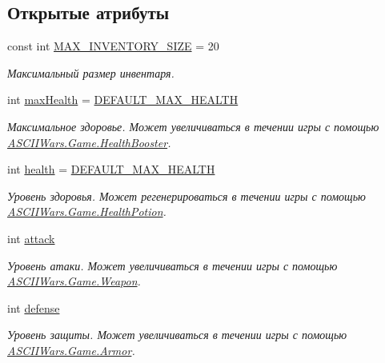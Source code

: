 \subsection*{Открытые атрибуты}
\begin{DoxyCompactItemize}
\item 
const int \hyperlink{class_a_s_c_i_i_wars_1_1_game_1_1_player_a1cc8a05398a717bcf8c5a0ebd2ea0747}{M\+A\+X\+\_\+\+I\+N\+V\+E\+N\+T\+O\+R\+Y\+\_\+\+S\+I\+ZE} = 20
\begin{DoxyCompactList}\small\item\em Максимальный размер инвентаря. \end{DoxyCompactList}\item 
int \hyperlink{class_a_s_c_i_i_wars_1_1_game_1_1_player_acfd121f865f0e5a87f177e93c82feadc}{max\+Health} = \hyperlink{class_a_s_c_i_i_wars_1_1_game_1_1_player_ab5921985db319187e317563c15ef48dc}{D\+E\+F\+A\+U\+L\+T\+\_\+\+M\+A\+X\+\_\+\+H\+E\+A\+L\+TH}
\begin{DoxyCompactList}\small\item\em Максимальное здоровье. Может увеличиваться в течении игры с помощью \hyperlink{class_a_s_c_i_i_wars_1_1_game_1_1_health_booster}{A\+S\+C\+I\+I\+Wars.\+Game.\+Health\+Booster}. \end{DoxyCompactList}\item 
int \hyperlink{class_a_s_c_i_i_wars_1_1_game_1_1_player_a8f364a47ef452b6c99bc13b7bdaae7ca}{health} = \hyperlink{class_a_s_c_i_i_wars_1_1_game_1_1_player_ab5921985db319187e317563c15ef48dc}{D\+E\+F\+A\+U\+L\+T\+\_\+\+M\+A\+X\+\_\+\+H\+E\+A\+L\+TH}
\begin{DoxyCompactList}\small\item\em Уровень здоровья. Может регенерироваться в течении игры с помощью \hyperlink{class_a_s_c_i_i_wars_1_1_game_1_1_health_potion}{A\+S\+C\+I\+I\+Wars.\+Game.\+Health\+Potion}. \end{DoxyCompactList}\item 
int \hyperlink{class_a_s_c_i_i_wars_1_1_game_1_1_player_a45736ed2f9941e3877df09db83cd4032}{attack}
\begin{DoxyCompactList}\small\item\em Уровень атаки. Может увеличиваться в течении игры с помощью \hyperlink{class_a_s_c_i_i_wars_1_1_game_1_1_weapon}{A\+S\+C\+I\+I\+Wars.\+Game.\+Weapon}. \end{DoxyCompactList}\item 
int \hyperlink{class_a_s_c_i_i_wars_1_1_game_1_1_player_a1dc39c7d8054c42dcb7af70e78b3be02}{defense}
\begin{DoxyCompactList}\small\item\em Уровень защиты. Может увеличиваться в течении игры с помощью \hyperlink{class_a_s_c_i_i_wars_1_1_game_1_1_armor}{A\+S\+C\+I\+I\+Wars.\+Game.\+Armor}. \end{DoxyCompactList}\item 

\end{DoxyCompactItemize}
